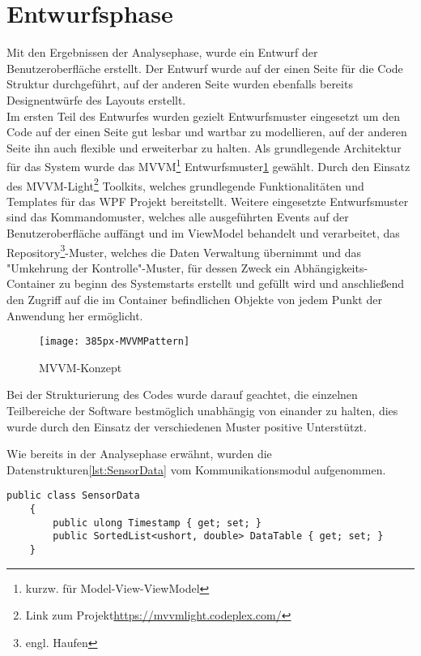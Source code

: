 \section{Entwurfsphase}
Mit den Ergebnissen der Analysephase, wurde ein Entwurf der Benutzeroberfläche erstellt. Der Entwurf wurde auf der einen Seite für die Code Struktur durchgeführt, auf der anderen Seite wurden ebenfalls bereits Designentwürfe des Layouts erstellt.\\
Im ersten Teil des Entwurfes wurden gezielt Entwurfsmuster eingesetzt um den Code auf der einen Seite gut lesbar und wartbar zu modellieren, auf der anderen Seite ihn auch flexible und erweiterbar zu halten. Als grundlegende Architektur für das System wurde das MVVM\footnote{kurzw. für Model-View-ViewModel} Entwurfsmuster\ref{fig:mvvm} gewählt. Durch den Einsatz des MVVM-Light\footnote{Link zum Projekt\url{https://mvvmlight.codeplex.com/}} Toolkits, welches grundlegende Funktionalitäten und Templates für das WPF Projekt bereitstellt. Weitere eingesetzte Entwurfsmuster sind das Kommandomuster, welches alle ausgeführten Events auf der Benutzeroberfläche auffängt und im ViewModel behandelt und verarbeitet, das Repository\footnote{engl. Haufen}-Muster, welches die Daten Verwaltung übernimmt und das "Umkehrung der Kontrolle"-Muster, für dessen Zweck ein Abhängigkeits-Container zu beginn des Systemstarts erstellt und gefüllt wird und anschließend den Zugriff auf die im Container befindlichen Objekte von jedem Punkt der Anwendung her ermöglicht.\\

\begin{figure}[h]
	\centering
		\texttt{[image: 385px-MVVMPattern]}
		\caption{MVVM-Konzept}
		\label{fig:mvvm}
\end{figure}

Bei der Strukturierung des Codes wurde darauf geachtet, die einzelnen Teilbereiche der Software bestmöglich unabhängig von einander zu halten, dies wurde durch den Einsatz der verschiedenen Muster positive Unterstützt.

Wie bereits in der Analysephase erwähnt, wurden die Datenstrukturen\ref{lst:SensorData} vom Kommunikationsmodul aufgenommen.

\begin{lstlisting}[frame=single, caption=Beschreibung der Sensordatenstruktur, label=lst:SensorData]
    public class SensorData
    {
        public ulong Timestamp { get; set; }
        public SortedList<ushort, double> DataTable { get; set; }
    }
\end{lstlisting}



